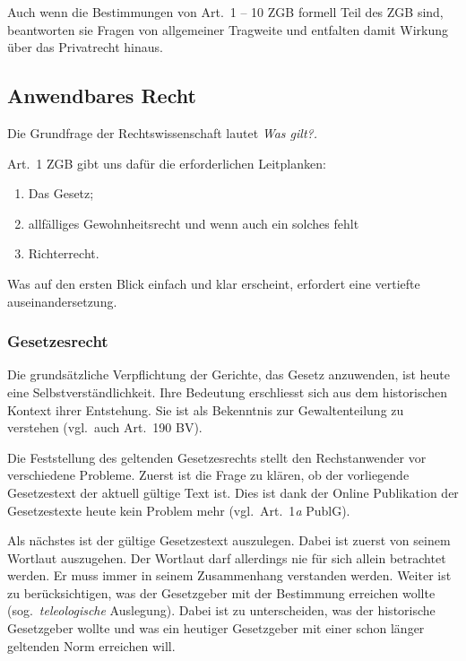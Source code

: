Auch wenn die Bestimmungen von Art.\ 1 -- 10 ZGB formell Teil des ZGB
sind, beantworten sie Fragen von allgemeiner Tragweite\autocite[Seite
31]{tuor_schnyder} und entfalten damit Wirkung über das Privatrecht
hinaus\autocite[\S\ 3]{riemer_einleitungsartikel}.

\subsection{Anwendbares Recht}
Die Grundfrage der Rechtswissenschaft lautet \itshape \flqq Was
gilt?\frqq\normalfont.

Art.\ 1 ZGB gibt uns dafür die erforderlichen Leitplanken:

\begin{enumerate}
    \item Das Gesetz;
    \item allfälliges Gewohnheitsrecht und wenn auch ein solches fehlt
    \item Richterrecht\autocite[\S\ 4 N.\ 2]{riemer_einleitungsartikel}.
\end{enumerate}

Was auf den ersten Blick einfach und klar erscheint, erfordert eine
vertiefte auseinandersetzung.

\subsubsection{Gesetzesrecht}
Die grundsätzliche Verpflichtung der Gerichte, das Gesetz anzuwenden,
ist heute eine Selbstverständlichkeit. Ihre Bedeutung erschliesst sich
aus dem historischen Kontext ihrer Entstehung. Sie ist als Bekenntnis
zur Gewaltenteilung zu verstehen\autocite[Seite 32]{tuor_schnyder}
(vgl.\ auch Art.\ 190 BV\autocite[Seite 428]{botschaft_bv}).

Die Feststellung des geltenden Gesetzesrechts stellt den Rechstanwender
vor verschiedene Probleme. Zuerst ist die Frage zu klären, ob der
vorliegende Gesetzestext der aktuell gültige Text ist. Dies ist dank der
Online Publikation der Gesetzestexte heute kein Problem mehr (vgl.\
Art.\ 1\textit{a} PublG). 

Als nächstes ist der gültige Gesetzestext
auszulegen. Dabei ist zuerst von seinem Wortlaut auszugehen. Der
Wortlaut darf allerdings nie für sich allein betrachtet werden. Er muss
immer in seinem Zusammenhang verstanden werden\autocite[\S\ 4 N.\
35]{riemer_einleitungsartikel}. Weiter ist zu berücksichtigen, was der
Gesetzgeber mit der Bestimmung erreichen wollte (sog.\
\textit{teleologische} Auslegung). Dabei ist zu unterscheiden, was der
historische Gesetzgeber wollte und was ein heutiger Gesetzgeber mit
einer schon länger geltenden Norm erreichen will.

